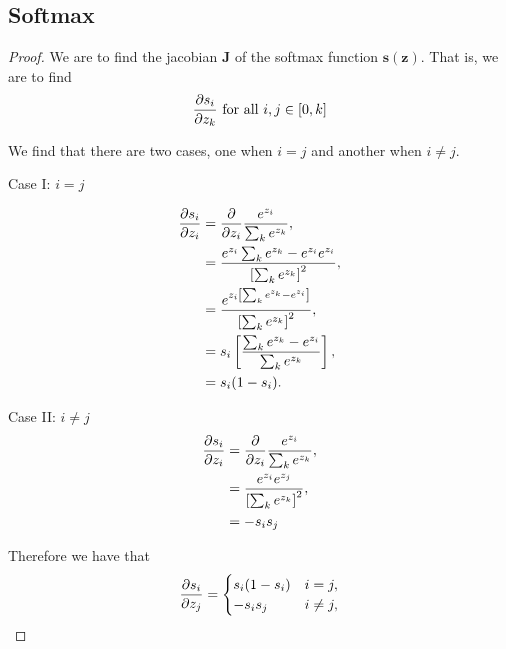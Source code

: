 \documentclass[twoside]{article}
\begin{document}
\subsection{Softmax}
\begin{proof}
    We are to find the jacobian $\mathbf{J}$ of the softmax function $\mathbf{s}(\mathbf{z})$. That is, we are to find
    \begin{equation*}
        \pdv{s_{i}}{z_{k}} \text{ for all } i, j \in [0, k]
    \end{equation*}

    We find that there are two cases, one when $i = j$ and another when $i \neq j$.

    Case I: $i = j$

    \begin{align*}
        \pdv{s_{i}}{z_{i}} &= \pdv{}{z_{i}} \frac{e^{z_{i}}}{\sum_{k}e^{z_{k}}},\\
                           &= \frac{e^{z_{i}}\sum_{k}e^{z_{k}} - e^{z_{i}}e^{z_{i}}}{\left[\sum_{k}e^{z_{k}}\right]^{2}},\\
                           &= \frac{e^{z_{i}\left[\sum_{k}e^{z_{k}} - e^{z_{i}}\right]}}{\left[\sum_{k}e^{z_{k}}\right]^{2}},\\
                           &= s_{i}\left[\frac{\sum_{k}e^{z_{k}} - e^{z_{i}}}{\sum_{k}e^{z_{k}}}\right],\\
                           &= s_{i}(1 - s_{i}).
    \end{align*}

    Case II: $i \neq j$
    \begin{align*}
        \pdv{s_{i}}{z_{i}} &= \pdv{}{z_{i}} \frac{e^{z_{i}}}{\sum_{k}e^{z_{k}}},\\
                           &= \frac{e^{z_{i}}e^{z_{j}}}{\left[\sum_{k}e^{z_{k}}\right]^{2}},\\
                           &= -s_{i}s_{j}
    \end{align*}

    Therefore we have that
    \begin{equation*}
        \pdv{s_{i}}{z_{j}} = \begin{cases}
            s_{i}(1 - s_{i}) & i = j,\\
            -s_{i}s_{j} & i \neq j,\\
            \end{cases}
    \end{equation*}
\end{proof}

\newpage
\end{document}
